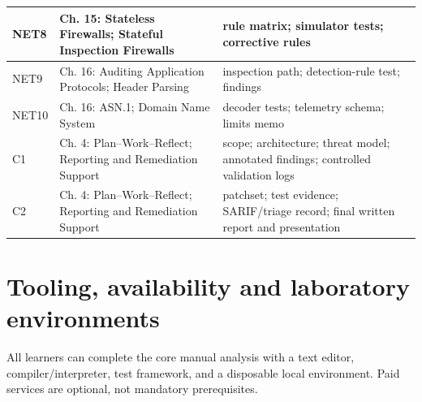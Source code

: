 \documentclass[10pt,letterpaper]{article}
\begin{document}
\begin{longtable}{>{\raggedright\arraybackslash}p{}>{\raggedright\arraybackslash}p{}>{\raggedright\arraybackslash}p{}}
NET8 & Ch. 15: Stateless Firewalls; Stateful Inspection Firewalls & rule matrix; simulator tests; corrective rules\\\midrule
NET9 & Ch. 16: Auditing Application Protocols; Header Parsing & inspection path; detection-rule test; findings\\\midrule
NET10 & Ch. 16: ASN.1; Domain Name System & decoder tests; telemetry schema; limits memo\\\midrule
C1 & Ch. 4: Plan--Work--Reflect; Reporting and Remediation Support & scope; architecture; threat model; annotated findings; controlled validation logs\\\midrule
C2 & Ch. 4: Plan--Work--Reflect; Reporting and Remediation Support & patchset; test evidence; SARIF/triage record; final written report and presentation\\\midrule
\bottomrule\end{longtable}\endgroup
\section{Tooling, availability and laboratory environments}
All learners can complete the core manual analysis with a text editor, compiler/interpreter, test framework, and a disposable local environment. Paid services are optional, not mandatory prerequisites.
\end{document}
